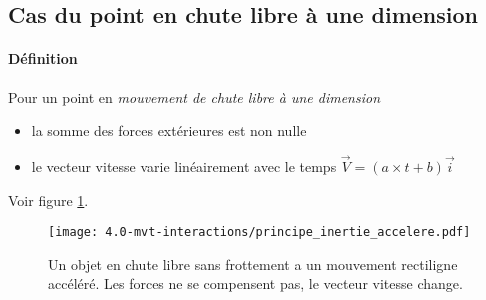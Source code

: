 \subsection{Cas du point en chute libre à une dimension}
\paragraph{Définition}
Pour un point en \textit{mouvement de chute libre à une dimension}
\begin{itemize}
 \item la somme des forces extérieures est non nulle
 \item le vecteur vitesse varie linéairement avec le temps $\overrightarrow{V} = (a \times t + b)\overrightarrow{i}$
\end{itemize}
Voir figure \ref{fig:principe_inertie_accelere}.
\begin{figure}[h!]
  \begin{center}
      \texttt{[image: 4.0-mvt-interactions/principe\_inertie\_accelere.pdf]}
  \end{center}
  \caption{Un objet en chute libre sans frottement a un mouvement rectiligne accéléré. Les forces ne se compensent pas, le vecteur vitesse change.}
  \label{fig:principe_inertie_accelere}
\end{figure}

